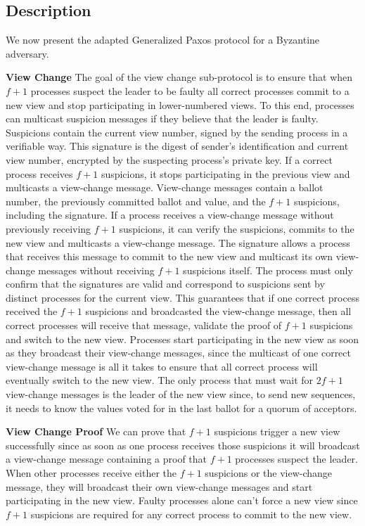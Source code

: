 \subsection{Description}
We now present the adapted Generalized Paxos protocol for a Byzantine adversary.\par
\textbf{View Change} The goal of the view change sub-protocol is to ensure that when $f+1$ processes suspect the leader to be faulty all correct processes commit to a new view and stop participating in lower-numbered views. To this end, processes can multicast suspicion messages if they believe that the leader is faulty. Suspicions contain the current view number, signed by the sending process in a verifiable way. This signature is the digest of sender's identification and current view number, encrypted by the suspecting process's private key. If a correct process receives $f+1$ suspicions, it stops participating in the previous view and multicasts a view-change message. View-change messages contain a ballot number, the previously committed ballot and value, and the $f+1$ suspicions, including the signature. If a process receives a view-change message without previously receiving $f+1$ suspicions, it can verify the suspicions, commits to the new view and multicasts a view-change message. The signature allows a process that receives this message to commit to the new view and multicast its own view-change messages without receiving $f+1$ suspicions itself. The process must only confirm that the signatures are valid and correspond to suspicions sent by distinct processes for the current view. This guarantees that if one correct process received the $f+1$ suspicions and broadcasted the view-change message, then all correct processes will receive that message, validate the proof of $f+1$ suspicions and switch to the new view. Processes start participating in the new view as soon as they broadcast their view-change messages, since the multicast of one correct view-change message is all it takes to ensure that all correct process will eventually switch to the new view. The only process that must wait for $2f+1$ view-change messages is the leader of the new view since, to send new sequences, it needs to know the values voted for in the last ballot for a quorum of acceptors. \par
\textbf{View Change Proof} We can prove that $f+1$ suspicions trigger a new view successfully since as soon as one process receives those suspicions it will broadcast a view-change message containing a proof that $f+1$ processes suspect the leader. When other processes receive either the $f+1$ suspicions or the view-change message, they will broadcast their own view-change messages and start participating in the new view. Faulty processes alone can't force a new view since $f+1$ suspicions are required for any correct process to commit to the new view.\par
